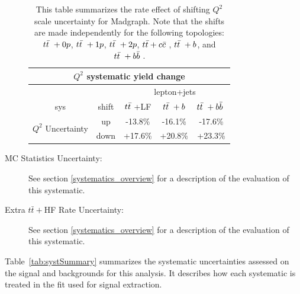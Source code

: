 \begin{description}
\begin{table}[hbtp] \small
   \centering 
    \begin{tabular}{|c|c|c|c|c|} \hline 
 \multicolumn{5}{|c|}{$Q^2$ systematic yield change} \\ \hline
 \multicolumn{2}{|c}{ } & \multicolumn{3}{|c|}{lepton+jets} \\ \hline
 sys & shift & $t{\bar{t}}~$+LF & $t{\bar{t}}~ + b$ & $t{\bar{t}}~ + b{\bar{b}}~$ \\ \hline 
 \multirow{2}{*}{$Q^2$ Uncertainty} & up   & -13.8\% & -16.1\% & -17.6\% \\
                                    & down & +17.6\% & +20.8\% & +23.3\% \\ 
 \hline
   \end{tabular} 
   \caption{This table summarizes the rate effect of shifting $Q^2$ scale uncertainty for Madgraph.  Note that the shifts are made independently for the following topologies: $t{\bar{t}}~ + 0p$, $t{\bar{t}}~ + 1p$, $t{\bar{t}}~+2p$, $t{\bar{t}}+c{\bar{c}}~$, $t{\bar{t}}~+b$, and $t{\bar{t}}~+b{\bar{b}}~$.}
   \label{tab:Q2Rates}
 \end{table} 

 \item[MC Statistics Uncertainty:] See section \ref{systematics_overview}
  for a description of the evaluation of this systematic.

 \item[Extra $t\bar{t}+$HF Rate Uncertainty:] See section \ref{systematics_overview}
  for a description of the evaluation of this systematic.

\end{description}


\par Table~\ref{tab:systSummary} summarizes the systematic uncertainties
assessed on the signal and backgrounds for this analysis. It describes
how each systematic is treated in the fit used for signal extraction.


